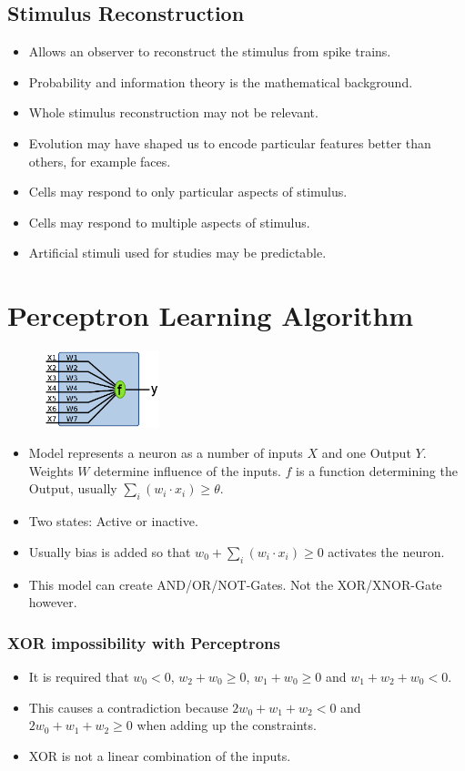 \documentclass[a4paper, 12pt]{article}
\begin{document}
\subsection{Stimulus Reconstruction}
\begin{itemize}[noitemsep,nolistsep]
	\item Allows an observer to reconstruct the stimulus from spike trains.
	\item Probability and information theory is the mathematical background.
	\item Whole stimulus reconstruction may not be relevant.
	\item Evolution may have shaped us to encode particular features better than others, for example faces.
	\item Cells may respond to only particular aspects of stimulus.
	\item Cells may respond to multiple aspects of stimulus.
	\item Artificial stimuli used for studies may be predictable.
\end{itemize}

\section{Perceptron Learning Algorithm}
\begin{figure}[H]
	\centering
	\includegraphics[width=0.3\textwidth]{perceptron.png}
\end{figure}
\begin{itemize}[noitemsep,nolistsep]
	\item Model represents a neuron as a number of inputs $X$ and one Output $Y$. Weights $W$ determine influence of the inputs. $f$ is a function determining the Output, usually $\sum_i(w_i\cdot x_i) \geq \theta$.
	\item Two states: Active or inactive.
	\item Usually bias is added so that $w_0+\sum_i(w_i\cdot x_i)\geq0$ activates the neuron.
	\item This model can create AND/OR/NOT-Gates. Not the XOR/XNOR-Gate however.
\end{itemize}

\subsubsection{XOR impossibility with Perceptrons}
\begin{itemize}[noitemsep,nolistsep]
	\item It is required that $w_0 < 0$, $w_2+w_0 \geq 0$, $w_1+w_0 \geq 0$ and $w_1+w_2+w_0 < 0$.
	\item This causes a contradiction because $2w_0 + w_1 + w_2 < 0$ and $2w_0 + w_1 + w_2 \geq 0$ when adding up the constraints.
	\item XOR is not a linear combination of the inputs.
\end{itemize}
\end{document}
